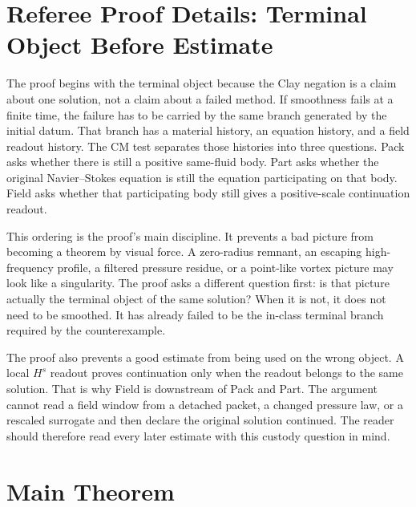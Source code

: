 \section{Referee Proof Details: Terminal Object Before Estimate}

The proof begins with the terminal object because the Clay negation is a claim about one solution, not a claim about a failed method.
If smoothness fails at a finite time, the failure has to be carried by the same branch generated by the initial datum.
That branch has a material history, an equation history, and a field readout history.
The CM test separates those histories into three questions.
Pack asks whether there is still a positive same-fluid body.
Part asks whether the original Navier--Stokes equation is still the equation participating on that body.
Field asks whether that participating body still gives a positive-scale continuation readout.

This ordering is the proof's main discipline.
It prevents a bad picture from becoming a theorem by visual force.
A zero-radius remnant, an escaping high-frequency profile, a filtered pressure residue, or a point-like vortex picture may look like a singularity.
The proof asks a different question first: is that picture actually the terminal object of the same solution?
When it is not, it does not need to be smoothed.
It has already failed to be the in-class terminal branch required by the counterexample.

The proof also prevents a good estimate from being used on the wrong object.
A local \(H^s\) readout proves continuation only when the readout belongs to the same solution.
That is why Field is downstream of Pack and Part.
The argument cannot read a field window from a detached packet, a changed pressure law, or a rescaled surrogate and then declare the original solution continued.
The reader should therefore read every later estimate with this custody question in mind.

\section{Main Theorem}

